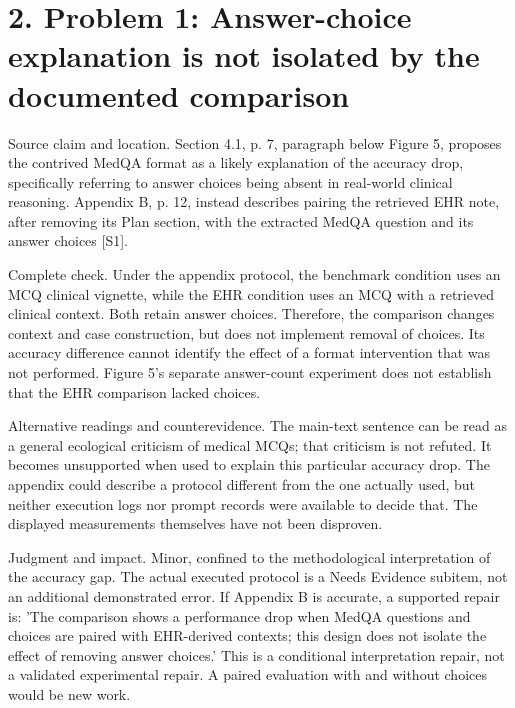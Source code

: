 \documentclass[10pt]{article}
\begin{document}
\section*{2. Problem 1: Answer-choice explanation is not isolated by the documented comparison}
Source claim and location. Section 4.1, p. 7, paragraph below Figure 5, proposes the contrived MedQA format as a likely explanation of the accuracy drop, specifically referring to answer choices being absent in real-world clinical reasoning. Appendix B, p. 12, instead describes pairing the retrieved EHR note, after removing its Plan section, with the extracted MedQA question and its answer choices [S1].\par
Complete check. Under the appendix protocol, the benchmark condition uses an MCQ clinical vignette, while the EHR condition uses an MCQ with a retrieved clinical context. Both retain answer choices. Therefore, the comparison changes context and case construction, but does not implement removal of choices. Its accuracy difference cannot identify the effect of a format intervention that was not performed. Figure 5’s separate answer-count experiment does not establish that the EHR comparison lacked choices.\par
Alternative readings and counterevidence. The main-text sentence can be read as a general ecological criticism of medical MCQs; that criticism is not refuted. It becomes unsupported when used to explain this particular accuracy drop. The appendix could describe a protocol different from the one actually used, but neither execution logs nor prompt records were available to decide that. The displayed measurements themselves have not been disproven.\par
Judgment and impact. Minor, confined to the methodological interpretation of the accuracy gap. The actual executed protocol is a Needs Evidence subitem, not an additional demonstrated error. If Appendix B is accurate, a supported repair is: ’The comparison shows a performance drop when MedQA questions and choices are paired with EHR-derived contexts; this design does not isolate the effect of removing answer choices.’ This is a conditional interpretation repair, not a validated experimental repair. A paired evaluation with and without choices would be new work.\par
\end{document}
